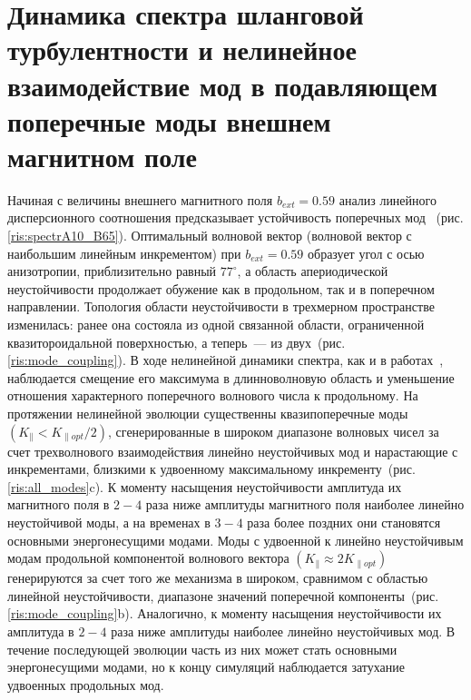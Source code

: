 \section{Динамика спектра шланговой турбулентности и нелинейное взаимодействие мод в подавляющем поперечные моды внешнем магнитном поле}


Начиная с величины внешнего магнитного поля $b_{ext}=0.59$ анализ линейного дисперсионного соотношения предсказывает устойчивость поперечных мод ~(рис. \ref{ris:spectrA10_B65}). Оптимальный волновой вектор (волновой вектор с наибольшим линейным инкрементом) при $b_{ext}=0.59$ образует угол с осью анизотропии, приблизительно равный $77^\circ$, а область апериодической неустойчивости продолжает обужение как в продольном, так и в поперечном направлении. Топология области неустойчивости в трехмерном пространстве изменилась: ранее она состояла из одной связанной области, ограниченной квазитороидальной поверхностью, а теперь~--- из двух~(рис. \ref{ris:mode_coupling}). В ходе нелинейной динамики спектра, как и в работах~\cite{Camporeale2008,Hellinger2014}, наблюдается смещение его максимума в длинноволновую область и уменьшение отношения характерного поперечного волнового числа к продольному. На протяжении нелинейной эволюции существенны квазипоперечные  моды  $\left(K_\|<K_{\|opt}/2\right)$, сгенерированные в широком диапазоне волновых чисел за счет трехволнового взаимодействия линейно неустойчивых мод и нарастающие с инкрементами, близкими к удвоенному максимальному инкременту~(рис. \ref{ris:all_modes}c). К моменту насыщения неустойчивости амплитуда их магнитного поля в $2-4$ раза ниже амплитуды магнитного поля наиболее линейно неустойчивой моды, а на временах в $3-4$ раза более поздних они становятся основными энергонесущими модами. Моды с удвоенной к линейно неустойчивым модам продольной компонентой волнового вектора $\left(K_\|\approx2K_{\|opt}\right)$ генерируются за счет того же механизма в широком, сравнимом с областью линейной неустойчивости, диапазоне значений поперечной компоненты~(рис. \ref{ris:mode_coupling}b). Аналогично,  к моменту насыщения неустойчивости их амплитуда в $2-4$ раза ниже амплитуды наиболее линейно неустойчивых мод. В течение последующей эволюции часть из них может стать основными энергонесущими модами, но к концу симуляций наблюдается затухание удвоенных продольных мод. 


